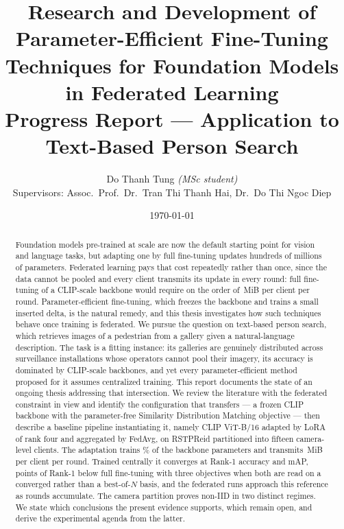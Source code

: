 \documentclass[11pt,a4paper]{article}
\title{\bfseries Research and Development of Parameter-Efficient Fine-Tuning\\Techniques for Foundation Models in Federated Learning\\[4pt]
\large Progress Report --- Application to Text-Based Person Search}
\author{Do Thanh Tung \quad\textit{(MSc student)}\\[2pt]
Supervisors: Assoc.\ Prof.\ Dr.\ Tran Thi Thanh Hai, \quad Dr.\ Do Thi Ngoc Diep}
\date{\today}
\renewcommand{\_}{\textunderscore\allowbreak{}}
\begin{document}
\maketitle

\begin{abstract}
\noindent
Foundation models pre-trained at scale are now the default starting point for vision and language tasks, but adapting one by full fine-tuning updates hundreds of millions of parameters. Federated learning pays that cost repeatedly rather than once, since the data cannot be pooled and every client transmits its update in every round: full fine-tuning of a CLIP-scale backbone would require on the order of \numUplinkFull\,MiB per client per round. Parameter-efficient fine-tuning, which freezes the backbone and trains a small inserted delta, is the natural remedy, and this thesis investigates how such techniques behave once training is federated. We pursue the question on text-based person search, which retrieves images of a pedestrian from a gallery given a natural-language description. The task is a fitting instance: its galleries are genuinely distributed across surveillance installations whose operators cannot pool their imagery, its accuracy is dominated by CLIP-scale backbones, and yet every parameter-efficient method proposed for it assumes centralized training. This report documents the state of an ongoing thesis addressing that intersection. We review the literature with the federated constraint in view and identify the configuration that transfers --- a frozen CLIP backbone with the parameter-free Similarity Distribution Matching objective --- then describe a baseline pipeline instantiating it, namely CLIP ViT-B/16 adapted by LoRA of rank four and aggregated by FedAvg, on RSTPReid partitioned into fifteen camera-level clients. The adaptation trains \numTrainPct\% of the backbone parameters and transmits \numUplinkLoRA\,MiB per client per round. Trained centrally it converges at \numCPlatR{} Rank-1 accuracy and \numCPlatM{} mAP, \numGapIrraConvR{} points of Rank-1 below full fine-tuning with three objectives when both are read on a converged rather than a best-of-$N$ basis, and the federated runs approach this reference as rounds accumulate. The camera partition proves non-IID in two distinct regimes. We state which conclusions the present evidence supports, which remain open, and derive the experimental agenda from the latter.
\end{abstract}

\setcounter{tocdepth}{1}
\tableofcontents













\appendix

\end{document}
